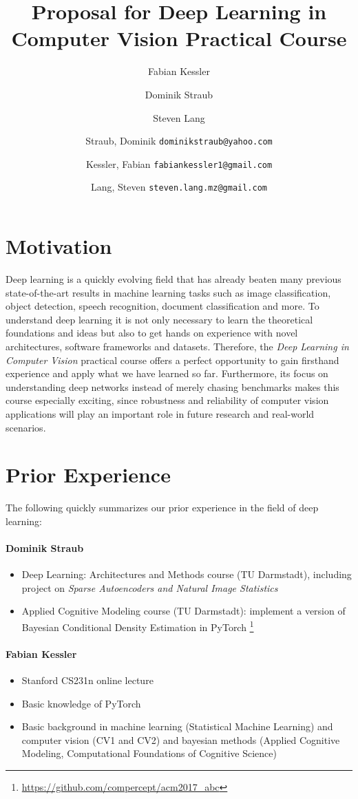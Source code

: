 \documentclass[11pt,english]{article}
\title{Proposal for Deep Learning in Computer Vision Practical Course}
\author{Fabian Kessler}
\author{Dominik Straub}
\author{Steven Lang}
\author{
	Straub, Dominik \texttt{dominikstraub@yahoo.com}
	\and
	Kessler, Fabian \texttt{fabiankessler1@gmail.com}
	\and
	Lang, Steven \texttt{steven.lang.mz@gmail.com}\\
}
\begin{document}
\maketitle
\section{Motivation}
Deep learning is a quickly evolving field that has already beaten many previous state-of-the-art results in machine learning tasks such as image classification, object detection, speech recognition, document classification and more. To understand deep learning it is not only necessary to learn the theoretical foundations and ideas but also to get hands on experience with novel architectures, software frameworks and datasets. Therefore, the \textit{Deep Learning in Computer Vision} practical course offers a perfect opportunity to gain firsthand experience and apply what we have learned so far. Furthermore, its focus on understanding deep networks instead of merely chasing benchmarks makes this course especially exciting, since robustness and reliability of computer vision applications will play an important role in future research and real-world scenarios.

\section{Prior Experience}
The following quickly summarizes our prior experience in the field of deep learning:

\paragraph{Dominik Straub}
\begin{itemize}
    \setlength\itemsep{-0.25em}
    \item Deep Learning: Architectures and Methods course (TU Darmstadt), including project on \textit{Sparse Autoencoders and Natural Image Statistics}
    \item Applied Cognitive Modeling course (TU Darmstadt): implement a version of Bayesian Conditional Density Estimation in PyTorch \footnote{\url{https://github.com/compercept/acm2017_abc}}
\end{itemize}
\paragraph{Fabian Kessler}
\begin{itemize}
    \setlength\itemsep{-0.25em}
    \item Stanford CS231n online lecture 
    \item Basic knowledge of PyTorch
    \item Basic background in machine learning (Statistical Machine Learning) and computer vision (CV1 and CV2) and bayesian methods (Applied Cognitive Modeling, Computational Foundations of Cognitive Science)
\end{itemize}
\end{document}
